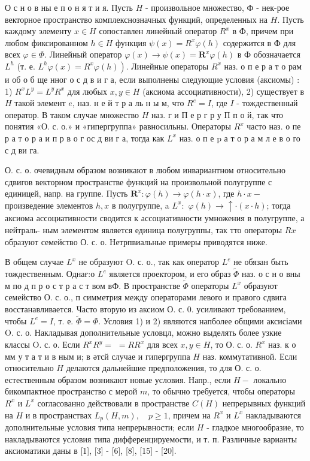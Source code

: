 \documentclass[10pt]{article}
\begin{document}
О с н о в ны е п о н я т и я. Пусть $H$ - произвольное множество, Ф - нек-рое векторное пространство комплекснозначных функций, определенных на $H$. Пусть каждому элементу $x \in H$ сопоставлен линейный оператор $R^{x}$ в $Ф$, причем при любом фиксированном $h \in H$ функция $\psi(x)=R^{x} \varphi(h)$ содержится в Ф для всех $\varphi \in \Phi$. Линейный оператор $\varphi(x) \rightarrow \psi(x)=\boldsymbol{R}^{x} \varphi(h)$ в Ф обозначается $L^{h}$ (т. е. $\left.L^{h} \varphi(x)=R^{x} \varphi(h)\right)$. Линейные операторы $R^{x}$ наз. о п е р а т о рам и об о б ще нног о с д в и г а, если выполнены следующие условия (аксиомы) : 1) $R^{x} L^{y}=L^{y} R^{x}$ для любых $x, y \in H$ (аксиома ассоциативности), 2) существует в $H$ такой элемент $e$, наз. н е й т р а ль н ы м, что $R^{e}=I$, где $I$ - тождественный оператор. В таком случае множество $H$ наз. г и П е р г р у П п о й, так что понятия «О. с. о.» и «гипергруппа» равносильны. Операторы $R^{x}$ часто наз. о пе р а т о р а и п р в о г ос д ви г а, тогда как $L^{x}$ наз. о п е $\mathrm{p}$ а т о р а м л е в о го с д ви га.



О. с. о. очевидным образом возникают в любом инвариантном относительно сдвигов векторном пространстве функций на произвольной полугруппе с единицей, напр. на группе. Пусть $\boldsymbol{R}^{x}: \varphi(h) \rightarrow \varphi(h \cdot x)$, где $h \cdot x-$ произведение элементов $h, x$ в полугруппе, a $L^{x}:$ $\varphi(h) \rightarrow \uparrow \cdot(x \cdot h)$; тогда аксиома ассоциативности сводится к ассоциативности умножения в полугруппе, а нейтраль- ным элементом является единица полугруппы, так тто операторы $R x$ образуют семейство О. с. о. Нетрпвиальные примеры приводятся ниже.



В общем случае $L^{x}$ не образуют O. с. о., так как оператор $L^{e}$ не обязан быть тождественным. Однағ:о $L^{e}$ является проектором, и его образ $\widetilde{\Phi}$ наз. о с н о вны м по д п р о с т р а с т вом вФ. В пространстве $\tilde{\Phi}$ операторы $L^{x}$ образуют семейство О. с. о., п симметрия между операторами левого и правого сдвига восстанавливается. Часто вторую из аксиом О. с. 0. усиливают требованием, чтобы $L^{e}=I$, т. е. $\tilde{\Phi}=\Phi$. Условия 1) и 2) являются напболее общими аксисіами O. с. о. Накладывая дополнительные условцл, можно выделять более узкие классы O. с. о. Если $R^{x} R^{y}=$ $=R R^{x}$ для всех $x, y \in H$, то О. с. о. $R^{x}$ наз. к о мм у т а т и в ным и; в әтсй случае и гипергруппа $H$ наз. коммутативной. Если относительно $H$ делаются дальнейшие предположения, то для О. с. о. естественным образом возникают новые условия. Напр., если $H-$ локально бикомпактное пространство с мерой $m$, то обычно требуется, чтобы операторы $R^{x}$ и $L^{x}$ согласованно действовали в пространстве $C(H)$ непрерывных функций на $H$ и в пространствах $L_{p}(H, m), \quad p \geqslant 1$, причем на $R^{x}$ и $L^{x}$ накладываются дополнительные условия типа непрерывности; если $H$ - гладкое многообразие, то накладываются условия типа дифференцируемости, и т. п. Различные варианты аксиоматики даны в [1], [3] - [6], [8], [15] - [20].
\end{document}

